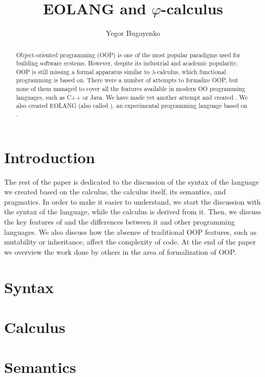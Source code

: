 \documentclass[sigplan,nonacm=true]{acmart}
\title{EOLANG and \texorpdfstring{$\varphi$}{phi}-calculus}
\author{Yegor Bugayenko}{}{}
\affiliation{
  \institution{}
  \city{Moscow}
  \country{Russia}
}
\begin{document}
\begin{abstract}
Object-oriented programming (OOP) is one of the most popular
paradigms used for building software systems. However, despite
its industrial and academic popularity, OOP is still missing
a formal apparatus similar to $\lambda$-calculus, which functional
programming is based on. There were a number of attempts to formalize
OOP, but none of them managed to cover all the features available in
modern OO programming languages, such as C++ or Java.
We have made yet another attempt and created \phic{}. We also
created EOLANG (also called \eo{}), an experimental
programming language based on \phic{}.
\end{abstract}

\maketitle

\section{Introduction}
\label{sec:intro}



The rest of the paper is dedicated to the discussion of the
syntax of the language we created based on the calculus,
the calculus itself, its semantics, and pragmatics.
In order to make it easier to understand, we start
the discussion with the syntax of the language, while the calculus
is derived from it. Then, we discuss the
key features of \eo{} and the differences between it and other
programming languages. We also discuss how the absence of traditional
OOP features, such as mutability or inheritance, affect the complexity of code.
At the end of the paper we overview the work done by others in the area of
formalization of OOP.

\section{Syntax}
\label{sec:syntax}


\section{Calculus}
\label{sec:calculus}


\section{Semantics}
\label{sec:semantics}

\end{document}
